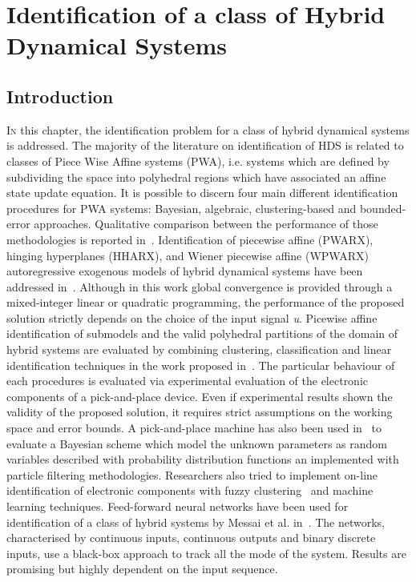
\chapter{Identification of a class of Hybrid Dynamical Systems}

\label{chap:identification}
\minitoc

\thispagestyle{empty}

\newpage
\section{Introduction}
\lettrine[lines=4]{\color{brickred}I}{n} this chapter, the identification problem for a class of hybrid dynamical systems is addressed.
The majority of the literature on identification of HDS is related to classes of Piece Wise Affine systems (PWA), i.e. systems which are defined by subdividing the  space into polyhedral regions which have associated an affine state update equation.
It is possible to discern four main different identification procedures for PWA systems: Bayesian, algebraic, clustering-based and bounded-error approaches. Qualitative comparison between the performance of those methodologies is reported in~\citep{Juloski,Paoletti}.
Identification of piecewise affine (PWARX), hinging hyperplanes (HHARX), and Wiener piecewise affine (WPWARX) autoregressive exogenous models of hybrid dynamical systems have been addressed in~\citep{Bemporad}. Although in this work global convergence is provided through a mixed-integer linear or quadratic programming, the performance of the proposed solution strictly depends on the choice of the input signal \textit{u}. 
Picewise affine identification of submodels and the valid polyhedral partitions of the domain of hybrid systems are evaluated by combining clustering, classification and linear identification techniques in the work proposed in~\citep{Ferrari}. 
The particular behaviour of each procedures is evaluated via experimental evaluation of the electronic components of a pick-and-place device. Even if experimental results shown the validity of the proposed solution, it requires strict assumptions on the working space and error bounds.
A pick-and-place machine has also been used in~\citep{juloski2005bayesian} to evaluate a Bayesian scheme which model the unknown parameters as random variables described with probability distribution functions an implemented with particle filtering methodologies.
%
Researchers also tried to implement on-line identification of electronic components with fuzzy clustering~\citep{sepasi2008line} and machine learning techniques.
Feed-forward neural networks have been used for identification of a class of hybrid systems by Messai et al. in~\citep{Messai,MESSAI2006217}. The networks, characterised by continuous inputs, continuous outputs and binary discrete inputs, use a black-box approach to track all the mode of the system. Results are promising but highly dependent on the input sequence.


